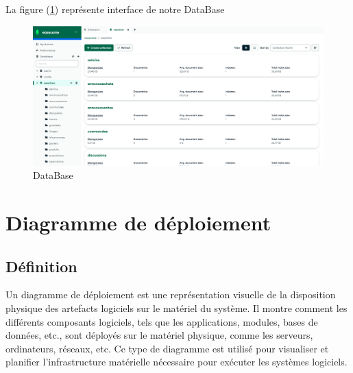 \documentclass[edit,12pt,a4paper,ChapStyle,oneside,doubleinterligne]{report}
\begin{document}
\newpage
La figure (\ref{fig:db}) représente interface de notre DataBase 
\begin{figure} [H]
    \centering
    \includegraphics[width=1\textwidth]{images/easycomdb.png}
    \caption{DataBase}
    \label{fig:db}
\end{figure}
\section{Diagramme de déploiement}
\subsection{Définition}
Un diagramme de déploiement est une représentation visuelle de la disposition physique des artefacts logiciels sur le matériel du système. Il montre comment les différents composants logiciels, tels que les applications, modules, bases de données, etc., sont déployés sur le matériel physique, comme les serveurs, ordinateurs, réseaux, etc. Ce type de diagramme est utilisé pour visualiser et planifier l'infrastructure matérielle nécessaire pour exécuter les systèmes logiciels\cite{dep}.
\end{document}
